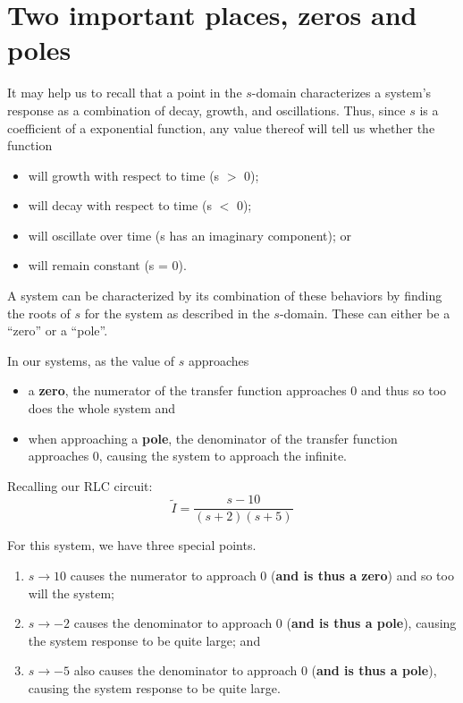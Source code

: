 \documentclass[11pt]{book}
\begin{document}
\section{Two important places, zeros and poles}
It may help us to recall that a point in the $s$-domain characterizes a system's response as a  combination of decay, growth, and oscillations. Thus, since $s$ is a coefficient of a exponential function, any value thereof will tell us whether the function 
\begin{itemize}
	\item will growth with respect to time (s $>$ 0);
	\item will decay with respect to time (s $<$ 0); 
	\item will oscillate over time (s has an imaginary component); or
	\item will remain constant (s = 0).
\end{itemize}

A system can be characterized by its combination of these behaviors by finding the roots of $s$ for the system as described in the $s$-domain. These can either be a ``zero'' or a ``pole''.

In our systems, as the value of $s$ approaches
\begin{itemize}
	\item a \textbf{zero}, the numerator of the transfer function approaches 0 and thus so too does the whole system and
	\item when approaching a \textbf{pole}, the denominator of the transfer function approaches 0, causing the system to approach the infinite.
\end{itemize}

Recalling our RLC circuit:
\begin{equation}
	\tilde{I} = \frac{s - 10}{(s+2)(s+5)}
\end{equation}

For this system, we have three special points.
\begin{enumerate}
	\item $s \rightarrow 10$ causes the numerator to approach 0 (\textbf{and is thus a zero}) and so too will the system;
	\item $s \rightarrow -2$ causes the denominator to approach 0 (\textbf{and is thus a pole}), causing the system response to be quite large; and
	\item $s \rightarrow -5$ also causes the denominator to approach 0 (\textbf{and is thus a pole}), causing the system response to be quite large.
\end{enumerate}
 
\end{document}
